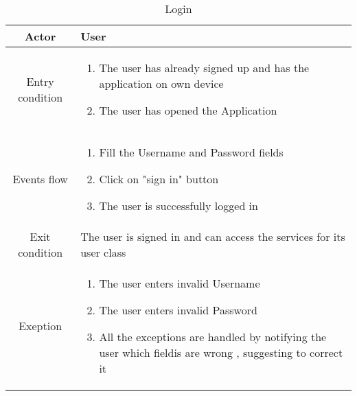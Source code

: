 \documentclass{article}
\begin{document}
		\begin{table} [H]
		\begin{center}
		\caption{Login}
		\begin{tabular}{|c|p{8cm}|}
			\hline
			Actor&User\\
			\hline
			Entry condition& \begin{enumerate}
								\item The user has already signed up and has the application on own device
								\item The user has opened the Application
							\end{enumerate}\\
			\hline
			Events flow& \begin{enumerate}
							\item Fill the Username and Password fields 
							\item Click on "sign in" button
							\item The user is successfully logged in 
			
						\end{enumerate}\\
			\hline
			Exit condition& The user is signed in and can access the services for its user class\\
			\hline
			Exeption& \begin{enumerate}
							\item The user enters invalid Username
							\item The user enters invalid Password
							\item All the exceptions are handled by notifying the user which fieldis are wrong , suggesting to correct it
						\end{enumerate}\\
			\hline
		\end{tabular}
		\end{center}
		\end{table} 
\end{document}
